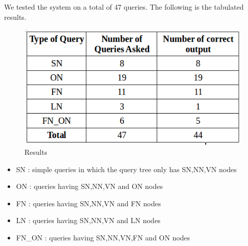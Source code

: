 We tested the system on a total of 47 queries. The following is the tabulated results.

\begin{figure}[htb]
\centering
\includegraphics[scale=0.55]{./Results} %
\caption{Results}
\label{fig:grammar} %
\end{figure}

\begin{itemize}
    \item SN : simple queries in which the query tree only has SN,NN,VN nodes
    \item ON : queries having SN,NN,VN and ON nodes  
    \item {FN : queries having SN,NN,VN and FN nodes  }
    \item {LN : queries having SN,NN,VN and LN nodes  }
    \item {FN\_ON : queries having SN,NN,VN,FN and ON nodes  }
\end{itemize}
    
    




